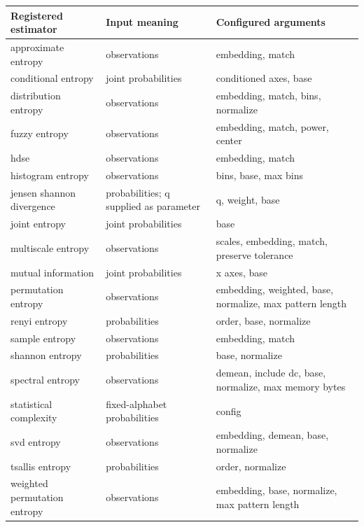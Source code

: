 \documentclass[
  english,
  11pt,
]{article}
\newcounter{none} %
\begin{document}
{\def\LTcaptype{none} %
\begin{longtable}[]{@{}
  >{\raggedright\arraybackslash}p{}
  >{\raggedright\arraybackslash}p{}
  >{\raggedright\arraybackslash}p{}@{}}
\toprule\noalign{}
\begin{minipage}[b]{\linewidth}\raggedright
Registered estimator
\end{minipage} & \begin{minipage}[b]{\linewidth}\raggedright
Input meaning
\end{minipage} & \begin{minipage}[b]{\linewidth}\raggedright
Configured arguments
\end{minipage} \\
\midrule\noalign{}
\endhead
\bottomrule\noalign{}
\endlastfoot
approximate entropy & observations & embedding, match \\
conditional entropy & joint probabilities & conditioned axes, base \\
distribution entropy & observations & embedding, match, bins,
normalize \\
fuzzy entropy & observations & embedding, match, power, center \\
hdse & observations & embedding, match \\
histogram entropy & observations & bins, base, max bins \\
jensen shannon divergence & probabilities; q supplied as parameter & q,
weight, base \\
joint entropy & joint probabilities & base \\
multiscale entropy & observations & scales, embedding, match, preserve
tolerance \\
mutual information & joint probabilities & x axes, base \\
permutation entropy & observations & embedding, weighted, base,
normalize, max pattern length \\
renyi entropy & probabilities & order, base, normalize \\
sample entropy & observations & embedding, match \\
shannon entropy & probabilities & base, normalize \\
spectral entropy & observations & demean, include dc, base, normalize,
max memory bytes \\
statistical complexity & fixed-alphabet probabilities & config \\
svd entropy & observations & embedding, demean, base, normalize \\
tsallis entropy & probabilities & order, normalize \\
weighted permutation entropy & observations & embedding, base,
normalize, max pattern length \\
\end{longtable}
}
\end{document}
